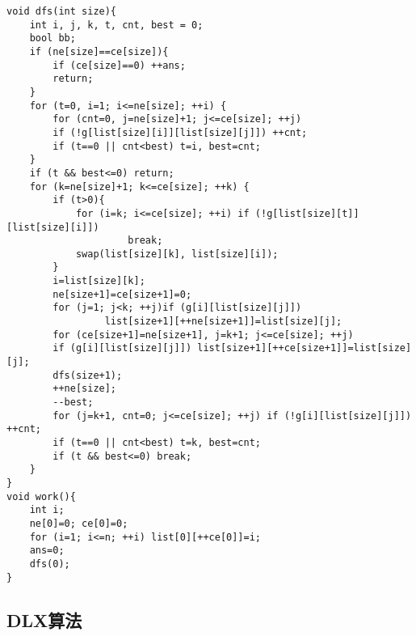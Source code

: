 \documentclass{article}
\begin{document}
\begin{lstlisting}
void dfs(int size){
    int i, j, k, t, cnt, best = 0;
    bool bb;
    if (ne[size]==ce[size]){
        if (ce[size]==0) ++ans;
        return;
    }
    for (t=0, i=1; i<=ne[size]; ++i) {
        for (cnt=0, j=ne[size]+1; j<=ce[size]; ++j)
        if (!g[list[size][i]][list[size][j]]) ++cnt;
        if (t==0 || cnt<best) t=i, best=cnt;
    }
    if (t && best<=0) return;
    for (k=ne[size]+1; k<=ce[size]; ++k) {
        if (t>0){
            for (i=k; i<=ce[size]; ++i) if (!g[list[size][t]][list[size][i]])
                     break;
            swap(list[size][k], list[size][i]);
        }
        i=list[size][k];
        ne[size+1]=ce[size+1]=0;
        for (j=1; j<k; ++j)if (g[i][list[size][j]])
                 list[size+1][++ne[size+1]]=list[size][j];
        for (ce[size+1]=ne[size+1], j=k+1; j<=ce[size]; ++j)
        if (g[i][list[size][j]]) list[size+1][++ce[size+1]]=list[size][j];
        dfs(size+1);
        ++ne[size];
        --best;
        for (j=k+1, cnt=0; j<=ce[size]; ++j) if (!g[i][list[size][j]]) ++cnt;
        if (t==0 || cnt<best) t=k, best=cnt;
        if (t && best<=0) break;
    }
}
void work(){
    int i;
    ne[0]=0; ce[0]=0;
    for (i=1; i<=n; ++i) list[0][++ce[0]]=i;
    ans=0;
    dfs(0);
}
\end{lstlisting}

\subsection{DLX算法}
\end{document}
